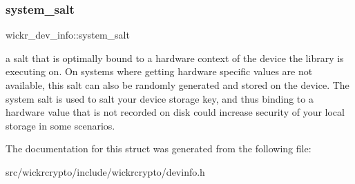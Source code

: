 \subsubsection{\texorpdfstring{system\+\_\+salt}{system\_salt}}
{\footnotesize\ttfamily wickr\+\_\+dev\+\_\+info\+::system\+\_\+salt}

a salt that is optimally bound to a hardware context of the device the library is executing on. On systems where getting hardware specific values are not available, this salt can also be randomly generated and stored on the device. The system salt is used to salt your device storage key, and thus binding to a hardware value that is not recorded on disk could increase security of your local storage in some scenarios. 

The documentation for this struct was generated from the following file\+:\begin{DoxyCompactItemize}
\item 
src/wickrcrypto/include/wickrcrypto/devinfo.\+h\end{DoxyCompactItemize}
